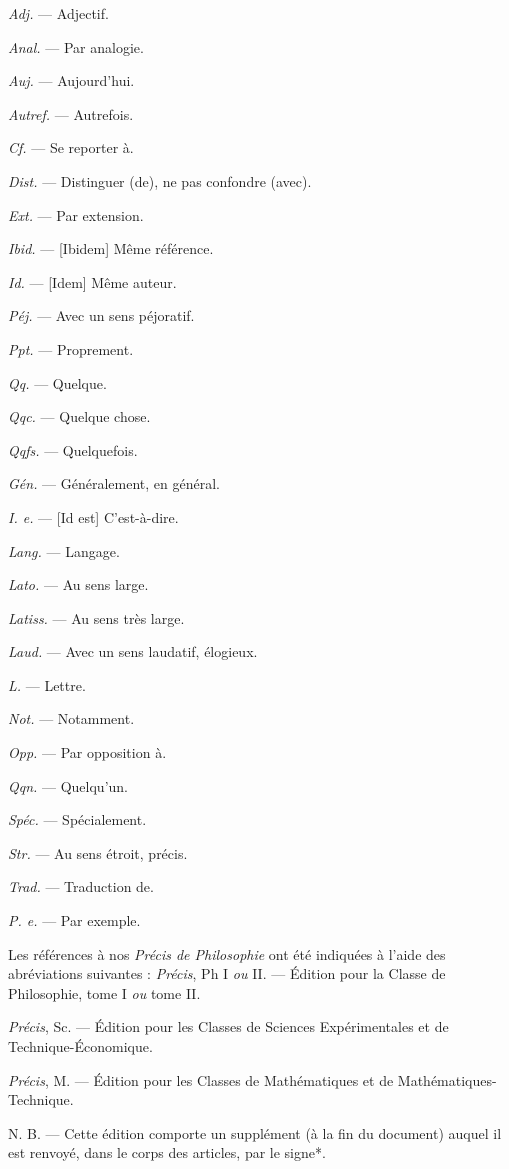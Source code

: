 \begin{minipage}[c]{.45\linewidth}
{\it Adj.} — Adjectif.

{\it Anal.} — Par analogie.

{\it Auj.} — Aujourd'hui.

{\it Autref.} — Autrefois.

{\it Cf.} — Se reporter à.

{\it Dist.} — Distinguer (de), ne pas confondre (avec).

{\it Ext.} — Par extension.

{\it Ibid.} — [{\it }Ibidem] Même référence.

{\it Id.} — [{\it }Idem] Même auteur.

{\it Péj.} — Avec un sens péjoratif.

{\it Ppt.} — Proprement.

{\it Qq.} — Quelque.

{\it Qqc.} — Quelque chose.

{\it Qqfs.} — Quelquefois.
\end{minipage}
\hfill
\begin{minipage}[c]{.45\linewidth}
{\it Gén.} — Généralement, en général.

{\it I. e.} — [{\it }Id est] C'est-à-dire.

{\it Lang.} — Langage.

{\it Lato.} — Au sens large.

{\it Latiss.} — Au sens très large.

{\it Laud.} — Avec un sens laudatif, élogieux.

{\it L.} — Lettre.

{\it Not.} — Notamment.

{\it Opp.} — Par opposition à.

{\it Qqn.} — Quelqu'un.

{\it Spéc.} — Spécialement.

{\it Str.} — Au sens étroit, précis.

{\it Trad.} — Traduction de.

{\it P. e.} — Par exemple.

\end{minipage}

\vspace{0.211cm}
Les références à nos {\it Précis de Philosophie} ont été indiquées à l’aide des
abréviations suivantes :
{\it Précis}, Ph I {\it ou} II. — Édition pour la Classe de Philosophie, tome I {\it ou} tome II.

{\it Précis}, Sc. — Édition pour les Classes de Sciences Expérimentales et de
Technique-Économique.

{\it Précis}, M. — Édition pour les Classes de Mathématiques et de
Mathématiques-Technique.

\vspace{0.211cm}
N. B. — Cette édition comporte un supplément (à la fin du document) auquel
il est renvoyé, dans le corps des articles, par le signe*.

